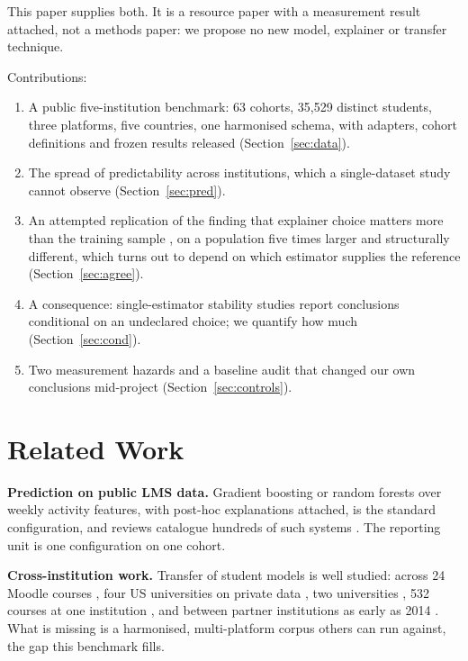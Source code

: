 \documentclass[conference]{IEEEtran}
\begin{document}
This paper supplies both. It is a resource paper with a measurement result attached, not a methods paper: we propose no new model, explainer or transfer technique.

Contributions:

\begin{enumerate}
\item A public five-institution benchmark: 63 cohorts, 35{,}529 distinct
students, three platforms, five countries, one harmonised schema, with adapters,
cohort definitions and frozen results released (Section~\ref{sec:data}).
\item The spread of predictability across institutions, which a single-dataset
study cannot observe (Section~\ref{sec:pred}).
\item An attempted replication of the finding that explainer choice matters more than the training sample \cite{swamy2022}, on a population five times larger and structurally different, which turns out to depend on which estimator supplies the reference (Section~\ref{sec:agree}).
\item A consequence: single-estimator stability studies report
conclusions conditional on an undeclared choice; we quantify how much
(Section~\ref{sec:cond}).
\item Two measurement hazards and a baseline audit that changed our own
conclusions mid-project (Section~\ref{sec:controls}).
\end{enumerate}

\section{Related Work}

\textbf{Prediction on public LMS data.} Gradient boosting or random forests over
weekly activity features, with post-hoc explanations attached, is the standard
configuration, and reviews catalogue hundreds of such systems
\cite{bettahi2025,boujmiraz2026,guevara2025}. The reporting unit is one
configuration on one cohort.

\textbf{Cross-institution work.} Transfer of student models is well studied: across 24 Moodle courses \cite{lopez2020,lopez2022}, four US universities on private data \cite{gardner2023}, two universities \cite{schwerter2026}, 532 courses at one institution \cite{riestra2021}, and between partner institutions as early as 2014 \cite{jayaprakash2014}. What is missing is a harmonised, multi-platform corpus others can run against, the gap this benchmark fills.
\end{document}
